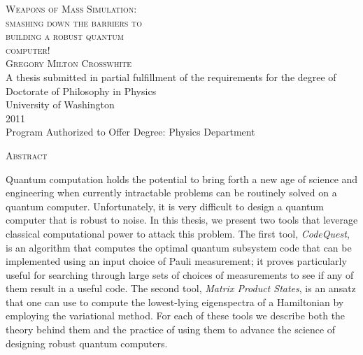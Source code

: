 \documentclass[12pt]{amsbook}
\theoremstyle{plain}
\theoremstyle{definition}
\theoremstyle{remark}
\begin{document}
\begin{center}

\textsc{\LARGE
Weapons of Mass Simulation:\\
smashing down the barriers to\\
building a robust quantum\\[0.25cm]
computer!
}\\[1.5cm]

\textsc{\Large Gregory Milton Crosswhite}\\[1.5cm]

A thesis submitted in partial fulfillment of the requirements for the degree of\\[1.5cm]

Doctorate of Philosophy in Physics\\[1.5cm]

University of Washington\\[1.5cm]

2011\\[1.5cm]

Program Authorized to Offer Degree:
Physics Department

\end{center}

\newpage
\begin{center}
\textsc{\Large Abstract}
\end{center}

Quantum computation holds the potential to bring forth a new age of science and engineering when currently intractable problems can be routinely solved on a quantum computer.  Unfortunately, it is very difficult to design a quantum computer that is robust to noise.  In this thesis, we present two tools that leverage classical computational power to attack this problem.  The first tool, \emph{CodeQuest}, is an algorithm that computes the optimal quantum subsystem code that can be implemented using an input choice of Pauli measurement;  it proves particularly useful for searching through large sets of choices of measurements to see if any of them result in a useful code.  The second tool, \emph{Matrix Product States}, is an ansatz that one can use to compute the lowest-lying eigenspectra of a Hamiltonian by employing the variational method.  For each of these tools we describe both the theory behind them and the practice of using them to advance the science of designing robust quantum computers.
\tableofcontents
\listoftables
\end{document}
